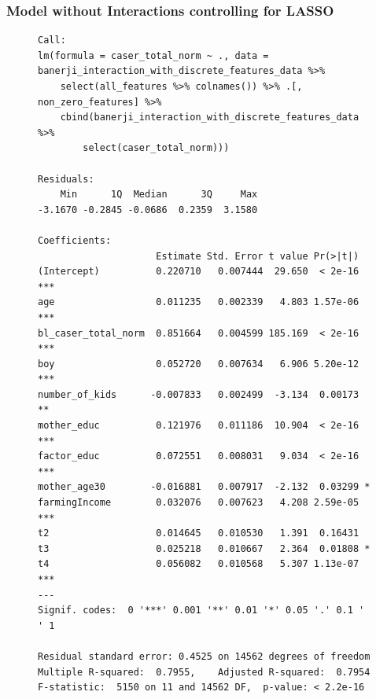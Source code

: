 \documentclass{article}
\begin{document}
\subsubsection*{Model without Interactions controlling for LASSO}
\begin{figure}[H]
\begin{lstlisting}[style=RstyleComment, caption=Model without Interactions controlling for LASSO]
Call:
lm(formula = caser_total_norm ~ ., data = banerji_interaction_with_discrete_features_data %>% 
    select(all_features %>% colnames()) %>% .[, non_zero_features] %>% 
    cbind(banerji_interaction_with_discrete_features_data %>% 
        select(caser_total_norm)))

Residuals:
    Min      1Q  Median      3Q     Max 
-3.1670 -0.2845 -0.0686  0.2359  3.1580 

Coefficients:
                     Estimate Std. Error t value Pr(>|t|)    
(Intercept)          0.220710   0.007444  29.650  < 2e-16 ***
age                  0.011235   0.002339   4.803 1.57e-06 ***
bl_caser_total_norm  0.851664   0.004599 185.169  < 2e-16 ***
boy                  0.052720   0.007634   6.906 5.20e-12 ***
number_of_kids      -0.007833   0.002499  -3.134  0.00173 ** 
mother_educ          0.121976   0.011186  10.904  < 2e-16 ***
factor_educ          0.072551   0.008031   9.034  < 2e-16 ***
mother_age30        -0.016881   0.007917  -2.132  0.03299 *  
farmingIncome        0.032076   0.007623   4.208 2.59e-05 ***
t2                   0.014645   0.010530   1.391  0.16431    
t3                   0.025218   0.010667   2.364  0.01808 *  
t4                   0.056082   0.010568   5.307 1.13e-07 ***
---
Signif. codes:  0 '***' 0.001 '**' 0.01 '*' 0.05 '.' 0.1 ' ' 1

Residual standard error: 0.4525 on 14562 degrees of freedom
Multiple R-squared:  0.7955,	Adjusted R-squared:  0.7954 
F-statistic:  5150 on 11 and 14562 DF,  p-value: < 2.2e-16
\end{lstlisting}
\end{figure}
\end{document}
